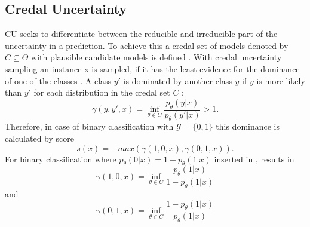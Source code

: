 \subsection{Credal Uncertainty}  
\label{subsec:credal_uncertainty}
%
\Ac{CU} seeks to differentiate between the reducible and irreducible part of the uncertainty in a prediction.
To achieve this a credal set of models denoted by $C \subseteq \Theta$ with plausible candidate models is defined \cite{nguyen2021howtomeasure}.
With credal uncertainty sampling an instance x is sampled, if it has the least evidence for the dominance of one of the classes \cite{nguyen2021howtomeasure}.
A class $y'$ is dominated by another class $y$ if $y$ is more likely than $y'$ for each distribution in the credal set $C$ \cite{nguyen2021howtomeasure}:
\begin{equation} \label{eq:credal_uncertainty_dominance}
\gamma(y,y',x) = \inf_{\theta \in C} \frac{p_{\theta}(y | x)}{p_{\theta}(y' | x)} > 1.
\end{equation} 
Therefore, in case of binary classification with $\mathcal{Y} = \{0, 1\}$ this dominance is calculated by score
\begin{equation}
    s(x) = -max (\gamma(1,0,x), \gamma(0,1,x)).
\end{equation} 
For binary classification where $p_{\theta}(0|x) = 1 - p_{\theta}(1|x)$ inserted in , results in  
\begin{equation}
\gamma(1,0,x) = \inf_{\theta \in C} \frac{p_{\theta}(1 | x)}{1 - p_{\theta}(1 | x)}
\end{equation} 
and
\begin{equation}
\gamma(0,1,x) = \inf_{\theta \in C} \frac{1 - p_{\theta}(1 | x)}{p_{\theta}(1 | x)}
\end{equation} 